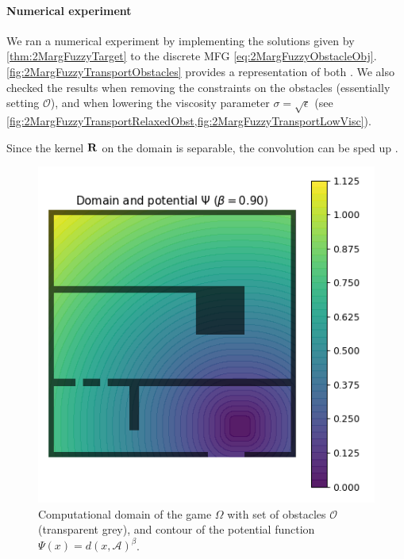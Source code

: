 \documentclass[../report.tex]{subfiles}
\begin{document}
\paragraph{Numerical experiment} We ran a numerical experiment by implementing the solutions given by \cref{thm:2MargFuzzyTarget} to the discrete MFG \eqref{eq:2MargFuzzyObstacleObj}. \cref{fig:2MargFuzzyTransportObstacles} provides a representation of both . We also checked the results when removing the constraints on the obstacles (essentially setting $\mathscr{O}$), and when lowering the viscosity parameter $\sigma = \sqrt{\epsilon}$ (see \cref{fig:2MargFuzzyTransportRelaxedObst,fig:2MargFuzzyTransportLowVisc}).

Since the kernel $\mathbf{R}$ on the domain is separable, the convolution can be sped up \cite[ch.~4]{peyr2018computational}.


\begin{figure}
	\centering
	\includegraphics[width=0.5\linewidth]{../project/images/crowd_potential.png}
	\caption{Computational domain of the game $\Omega$ with set of obstacles $\mathscr{O}$ (transparent grey), and contour of the potential function $\Psi(x) = d(x, \mathscr A)^\beta$.} \label{fig:CrowdExamplePotential}	
\end{figure}
\end{document}
